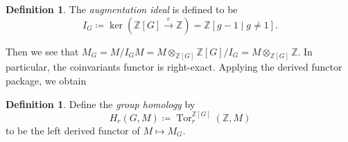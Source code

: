 \documentclass[leqno, openany]{memoir}
\theoremstyle{definition}
\newtheorem{defn}[thm]{Definition}
\theoremstyle{remark}
\theoremstyle{plain}
\theoremstyle{definition}
\theoremstyle{remark}
\newcommand{\Z}{\mathbb{Z}}
\newcommand{\ep}{\varepsilon}
\DeclareMathOperator{\Tor}{Tor}
\begin{document}
\begin{defn}
    The \textit{augmentation ideal} is defined to be
    \[ I_G \coloneqq \ker (\Z[G] \xrightarrow{\ep} \Z) = \Z[g-1 \mid g \neq 1]. \]
\end{defn}

Then we see that $M_G = M/I_G M = M \otimes_{\Z[G]} \Z[G]/I_G = M \otimes_{\Z[G]} \Z$. In particular, the coinvariants functor is right-exact. Applying the derived functor package, we obtain

\begin{defn}
    Define the \textit{group homology} by 
    \[ H_r(G, M) \coloneqq \Tor_r^{\Z[G]} (\Z, M) \]
    to be the left derived functor of $M \mapsto M_G$.
\end{defn}
\end{document}
